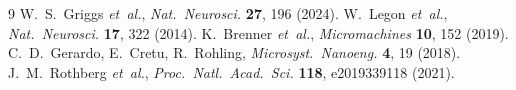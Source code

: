 \documentclass[11pt]{article}
\begin{document}
\begingroup
\small
\begin{thebibliography}{9}\setlength{\itemsep}{2pt}
   W.~S.~Griggs \emph{et~al.}, \emph{Nat.\ Neurosci.} \textbf{27}, 196 (2024).
   W.~Legon \emph{et~al.}, \emph{Nat.\ Neurosci.} \textbf{17}, 322 (2014).
   K.~Brenner \emph{et~al.}, \emph{Micromachines} \textbf{10}, 152 (2019).
   C.~D.~Gerardo, E.~Cretu, R.~Rohling, \emph{Microsyst.\ Nanoeng.} \textbf{4}, 19 (2018).
   J.~M.~Rothberg \emph{et~al.}, \emph{Proc.\ Natl.\ Acad.\ Sci.} \textbf{118}, e2019339118 (2021).
\end{thebibliography}
\endgroup
\end{document}
